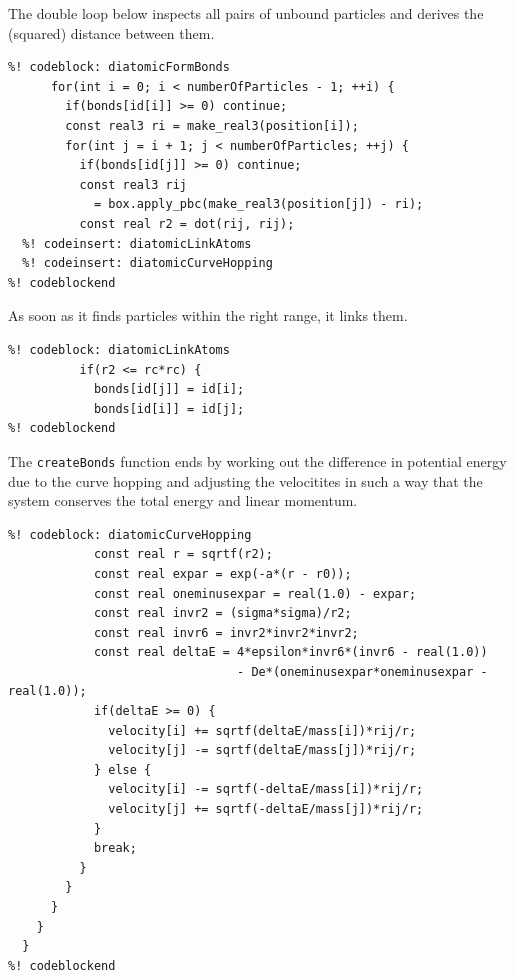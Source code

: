 The double loop below inspects all pairs of unbound particles and derives the 
(squared) distance between them.
\begin{lstlisting}
%! codeblock: diatomicFormBonds
      for(int i = 0; i < numberOfParticles - 1; ++i) {
        if(bonds[id[i]] >= 0) continue;
        const real3 ri = make_real3(position[i]);
        for(int j = i + 1; j < numberOfParticles; ++j) {
          if(bonds[id[j]] >= 0) continue;
          const real3 rij
            = box.apply_pbc(make_real3(position[j]) - ri);
          const real r2 = dot(rij, rij);
  %! codeinsert: diatomicLinkAtoms
  %! codeinsert: diatomicCurveHopping
%! codeblockend
\end{lstlisting}
As soon as it finds particles within the right range, it links them.
\begin{lstlisting}
%! codeblock: diatomicLinkAtoms
          if(r2 <= rc*rc) {
            bonds[id[j]] = id[i];
            bonds[id[i]] = id[j];
%! codeblockend
\end{lstlisting}
The \texttt{createBonds} function ends by working out the difference in 
potential energy due to the curve hopping and adjusting the velocitites in such 
a way that the system conserves the total energy and linear momentum.
\begin{lstlisting}
%! codeblock: diatomicCurveHopping
            const real r = sqrtf(r2);
            const real expar = exp(-a*(r - r0));
            const real oneminusexpar = real(1.0) - expar;
            const real invr2 = (sigma*sigma)/r2;
            const real invr6 = invr2*invr2*invr2;
            const real deltaE = 4*epsilon*invr6*(invr6 - real(1.0))
                                - De*(oneminusexpar*oneminusexpar - real(1.0));
            if(deltaE >= 0) {
              velocity[i] += sqrtf(deltaE/mass[i])*rij/r;
              velocity[j] -= sqrtf(deltaE/mass[j])*rij/r;
            } else {
              velocity[i] -= sqrtf(-deltaE/mass[i])*rij/r;
              velocity[j] += sqrtf(-deltaE/mass[j])*rij/r;
            }
            break;
          }
        }
      }
    }
  }
%! codeblockend
\end{lstlisting}

